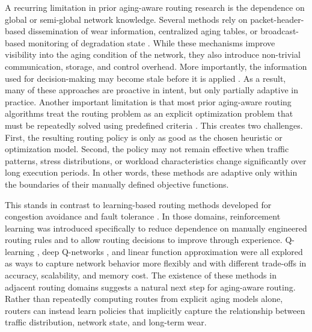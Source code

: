A recurring limitation in prior aging-aware routing research is the dependence on global or semi-global network knowledge. Several methods rely on packet-header-based dissemination of wear information, centralized aging tables, or broadcast-based monitoring of degradation state \cite{Clotho2015} \cite{Ghaderi2017}. While these mechanisms improve visibility into the aging condition of the network, they also introduce non-trivial communication, storage, and control overhead. More importantly, the information used for decision-making may become stale before it is applied \cite{Kondoth2026}. As a result, many of these approaches are proactive in intent, but only partially adaptive in practice. Another important limitation is that most prior aging-aware routing algorithms treat the routing problem as an explicit optimization problem that must be repeatedly solved using predefined criteria \cite{Clotho2015}. This creates two challenges. First, the resulting routing policy is only as good as the chosen heuristic or optimization model. Second, the policy may not remain effective when traffic patterns, stress distributions, or workload characteristics change significantly over long execution periods. In other words, these methods are adaptive only within the boundaries of their manually defined objective functions.

This stands in contrast to learning-based routing methods developed for congestion avoidance and fault tolerance \cite{Reza2021} \cite{Samala2020}. In those domains, reinforcement learning was introduced specifically to reduce dependence on manually engineered routing rules and to allow routing decisions to improve through experience. Q-learning \cite{Watkins1989}, deep Q-networks \cite{Hester2017}, and linear function approximation \cite{LARE2023} were all explored as ways to capture network behavior more flexibly and with different trade-offs in accuracy, scalability, and memory cost. The existence of these methods in adjacent routing domains suggests a natural next step for aging-aware routing. Rather than repeatedly computing routes from explicit aging models alone, routers can instead learn policies that implicitly capture the relationship between traffic distribution, network state, and long-term wear.

